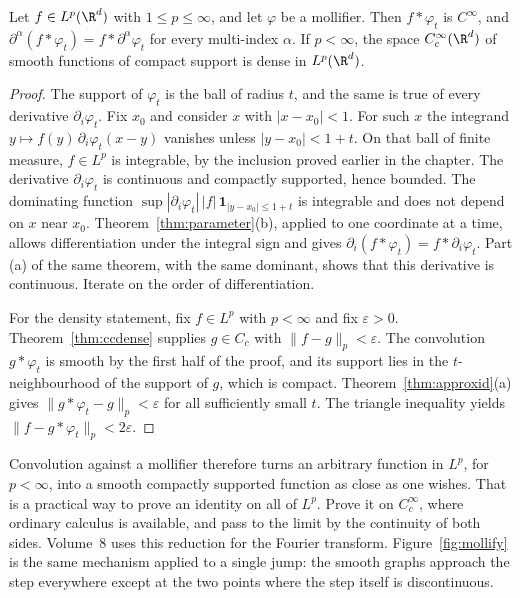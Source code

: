 \begin{theorem}\label{thm:smoothdense}
Let $f\in L^p(\R^d)$ with $1\le p\le\infty$, and let $\varphi$ be a mollifier. Then $f*\varphi_t$ is $C^\infty$, and $\partial^\alpha(f*\varphi_t)=f*\partial^\alpha\varphi_t$ for every multi-index $\alpha$. If $p<\infty$, the space $C_c^\infty(\R^d)$ of smooth functions of compact support is dense in $L^p(\R^d)$.
\end{theorem}
\begin{proof}
The support of $\varphi_t$ is the ball of radius $t$, and the same is true of every derivative $\partial_i\varphi_t$. Fix $x_0$ and consider $x$ with $|x-x_0|<1$. For such $x$ the integrand $y\mapsto f(y)\,\partial_i\varphi_t(x-y)$ vanishes unless $|y-x_0|<1+t$. On that ball of finite measure, $f\in L^p$ is integrable, by the inclusion proved earlier in the chapter. The derivative $\partial_i\varphi_t$ is continuous and compactly supported, hence bounded. The dominating function $\sup|\partial_i\varphi_t|\,|f|\,\mathbf 1_{|y-x_0|\le1+t}$ is integrable and does not depend on $x$ near $x_0$. Theorem~\ref{thm:parameter}(b), applied to one coordinate at a time, allows differentiation under the integral sign and gives $\partial_i(f*\varphi_t)=f*\partial_i\varphi_t$. Part (a) of the same theorem, with the same dominant, shows that this derivative is continuous. Iterate on the order of differentiation.

For the density statement, fix $f\in L^p$ with $p<\infty$ and fix $\varepsilon>0$. Theorem~\ref{thm:ccdense} supplies $g\in C_c$ with $\|f-g\|_p<\varepsilon$. The convolution $g*\varphi_t$ is smooth by the first half of the proof, and its support lies in the $t$-neighbourhood of the support of $g$, which is compact. Theorem~\ref{thm:approxid}(a) gives $\|g*\varphi_t-g\|_p<\varepsilon$ for all sufficiently small $t$. The triangle inequality yields $\|f-g*\varphi_t\|_p<2\varepsilon$.
\end{proof}

Convolution against a mollifier therefore turns an arbitrary function in $L^p$, for $p<\infty$, into a smooth compactly supported function as close as one wishes. That is a practical way to prove an identity on all of $L^p$. Prove it on $C_c^\infty$, where ordinary calculus is available, and pass to the limit by the continuity of both sides. Volume~8 uses this reduction for the Fourier transform. Figure~\ref{fig:mollify} is the same mechanism applied to a single jump: the smooth graphs approach the step everywhere except at the two points where the step itself is discontinuous.

